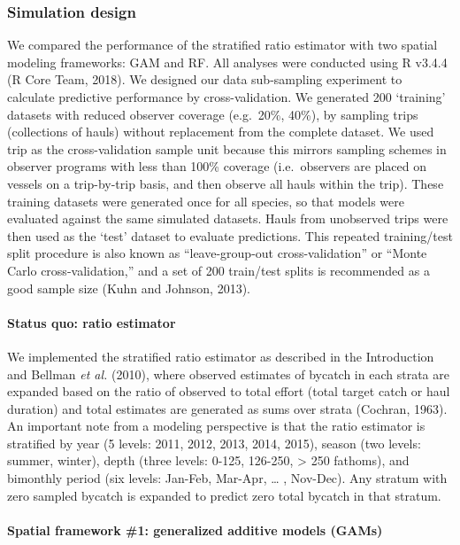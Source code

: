 \documentclass[]{article}
\let\oldparagraph\paragraph
\renewcommand{\paragraph}[1]{\oldparagraph{#1}\mbox{}}
\begin{document}
\subsubsection{Simulation design}\label{simulation-design}

We compared the performance of the stratified ratio estimator with two
spatial modeling frameworks: GAM and RF. All analyses were conducted
using R v3.4.4 (R Core Team, 2018). We designed our data sub-sampling
experiment to calculate predictive performance by cross-validation. We
generated 200 `training' datasets with reduced observer coverage
(e.g.~20\%, 40\%), by sampling trips (collections of hauls) without
replacement from the complete dataset. We used trip as the
cross-validation sample unit because this mirrors sampling schemes in
observer programs with less than 100\% coverage (i.e.~observers are
placed on vessels on a trip-by-trip basis, and then observe all hauls
within the trip). These training datasets were generated once for all
species, so that models were evaluated against the same simulated
datasets. Hauls from unobserved trips were then used as the `test'
dataset to evaluate predictions. This repeated training/test split
procedure is also known as ``leave-group-out cross-validation'' or
``Monte Carlo cross-validation,'' and a set of 200 train/test splits is
recommended as a good sample size (Kuhn and Johnson, 2013).

\paragraph{Status quo: ratio
estimator}\label{status-quo-ratio-estimator}

We implemented the stratified ratio estimator as described in the
Introduction and Bellman \emph{et al.} (2010), where observed estimates
of bycatch in each strata are expanded based on the ratio of observed to
total effort (total target catch or haul duration) and total estimates
are generated as sums over strata (Cochran, 1963). An important note
from a modeling perspective is that the ratio estimator is stratified by
year (5 levels: 2011, 2012, 2013, 2014, 2015), season (two levels:
summer, winter), depth (three levels: 0-125, 126-250, \textgreater{} 250
fathoms), and bimonthly period (six levels: Jan-Feb, Mar-Apr, \ldots{} ,
Nov-Dec). Any stratum with zero sampled bycatch is expanded to predict
zero total bycatch in that stratum.

\paragraph{Spatial framework \#1: generalized additive models
(GAMs)}\label{spatial-framework-1-generalized-additive-models-gams}
\end{document}
